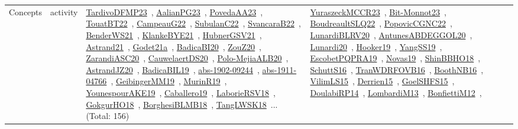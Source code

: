 {\begin{longtable}{lp{3cm}>{\raggedright\arraybackslash}p{6cm}>{\raggedright\arraybackslash}p{6cm}>{\raggedright\arraybackslash}p{8cm}}
Concepts & activity & \href{works/TardivoDFMP23.pdf}{TardivoDFMP23}~\cite{TardivoDFMP23}, \href{works/AalianPG23.pdf}{AalianPG23}~\cite{AalianPG23}, \href{works/PovedaAA23.pdf}{PovedaAA23}~\cite{PovedaAA23}, \href{works/TouatBT22.pdf}{TouatBT22}~\cite{TouatBT22}, \href{works/CampeauG22.pdf}{CampeauG22}~\cite{CampeauG22}, \href{works/SubulanC22.pdf}{SubulanC22}~\cite{SubulanC22}, \href{works/SvancaraB22.pdf}{SvancaraB22}~\cite{SvancaraB22}, \href{works/BenderWS21.pdf}{BenderWS21}~\cite{BenderWS21}, \href{works/KlankeBYE21.pdf}{KlankeBYE21}~\cite{KlankeBYE21}, \href{works/HubnerGSV21.pdf}{HubnerGSV21}~\cite{HubnerGSV21}, \href{works/Astrand21.pdf}{Astrand21}~\cite{Astrand21}, \href{works/Godet21a.pdf}{Godet21a}~\cite{Godet21a}, \href{works/BadicaBI20.pdf}{BadicaBI20}~\cite{BadicaBI20}, \href{works/ZouZ20.pdf}{ZouZ20}~\cite{ZouZ20}, \href{works/ZarandiASC20.pdf}{ZarandiASC20}~\cite{ZarandiASC20}, \href{works/CauwelaertDS20.pdf}{CauwelaertDS20}~\cite{CauwelaertDS20}, \href{works/Polo-MejiaALB20.pdf}{Polo-MejiaALB20}~\cite{Polo-MejiaALB20}, \href{works/AstrandJZ20.pdf}{AstrandJZ20}~\cite{AstrandJZ20}, \href{works/BadicaBIL19.pdf}{BadicaBIL19}~\cite{BadicaBIL19}, \href{works/abs-1902-09244.pdf}{abs-1902-09244}~\cite{abs-1902-09244}, \href{works/abs-1911-04766.pdf}{abs-1911-04766}~\cite{abs-1911-04766}, \href{works/GeibingerMM19.pdf}{GeibingerMM19}~\cite{GeibingerMM19}, \href{works/MurinR19.pdf}{MurinR19}~\cite{MurinR19}, \href{works/YounespourAKE19.pdf}{YounespourAKE19}~\cite{YounespourAKE19}, \href{works/Caballero19.pdf}{Caballero19}~\cite{Caballero19}, \href{works/LaborieRSV18.pdf}{LaborieRSV18}~\cite{LaborieRSV18}, \href{works/GokgurHO18.pdf}{GokgurHO18}~\cite{GokgurHO18}, \href{works/BorghesiBLMB18.pdf}{BorghesiBLMB18}~\cite{BorghesiBLMB18}, \href{works/TangLWSK18.pdf}{TangLWSK18}~\cite{TangLWSK18}... (Total: 156) & \href{works/YuraszeckMCCR23.pdf}{YuraszeckMCCR23}~\cite{YuraszeckMCCR23}, \href{works/Bit-Monnot23.pdf}{Bit-Monnot23}~\cite{Bit-Monnot23}, \href{works/BoudreaultSLQ22.pdf}{BoudreaultSLQ22}~\cite{BoudreaultSLQ22}, \href{works/PopovicCGNC22.pdf}{PopovicCGNC22}~\cite{PopovicCGNC22}, \href{works/LunardiBLRV20.pdf}{LunardiBLRV20}~\cite{LunardiBLRV20}, \href{works/AntunesABDEGGOL20.pdf}{AntunesABDEGGOL20}~\cite{AntunesABDEGGOL20}, \href{works/Lunardi20.pdf}{Lunardi20}~\cite{Lunardi20}, \href{works/Hooker19.pdf}{Hooker19}~\cite{Hooker19}, \href{works/YangSS19.pdf}{YangSS19}~\cite{YangSS19}, \href{works/EscobetPQPRA19.pdf}{EscobetPQPRA19}~\cite{EscobetPQPRA19}, \href{works/Novas19.pdf}{Novas19}~\cite{Novas19}, \href{works/ShinBBHO18.pdf}{ShinBBHO18}~\cite{ShinBBHO18}, \href{works/SchuttS16.pdf}{SchuttS16}~\cite{SchuttS16}, \href{works/TranWDRFOVB16.pdf}{TranWDRFOVB16}~\cite{TranWDRFOVB16}, \href{works/BoothNB16.pdf}{BoothNB16}~\cite{BoothNB16}, \href{works/VilimLS15.pdf}{VilimLS15}~\cite{VilimLS15}, \href{works/Derrien15.pdf}{Derrien15}~\cite{Derrien15}, \href{works/GoelSHFS15.pdf}{GoelSHFS15}~\cite{GoelSHFS15}, \href{works/DoulabiRP14.pdf}{DoulabiRP14}~\cite{DoulabiRP14}, \href{works/LombardiM13.pdf}{LombardiM13}~\cite{LombardiM13}, \href{works/BonfiettiM12.pdf}{BonfiettiM12}~\cite{BonfiettiM12}, 
\end{longtable}}

